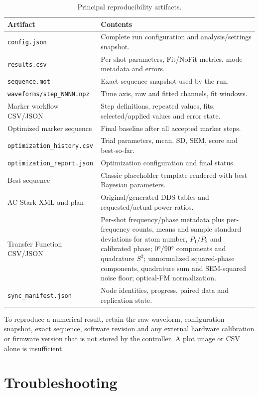 \documentclass[11pt,oneside,openany]{book}
\newcommand{\pathcode}[1]{\nolinkurl{#1}}
\begin{document}
\begin{table}[htbp]
\centering
\caption{Principal reproducibility artifacts.}
\begin{tabularx}{\textwidth}{l X}
\toprule
Artifact & Contents\\
\midrule
\pathcode{config.json} & Complete run configuration and analysis/settings snapshot.\\
\pathcode{results.csv} & Per-shot parameters, Fit/NoFit metrics, mode metadata and errors.\\
\pathcode{sequence.mot} & Exact sequence snapshot used by the run.\\
\pathcode{waveforms/step_NNNN.npz} & Time axis, raw and fitted channels, fit windows.\\
Marker workflow CSV/JSON & Step definitions, repeated values, fits, selected/applied values
and error state.\\
Optimized marker sequence & Final baseline after all accepted marker steps.\\
\pathcode{optimization_history.csv} & Trial parameters, mean, SD, SEM, score and best-so-far.\\
\pathcode{optimization_report.json} & Optimization configuration and final status.\\
Best sequence & Classic placeholder template rendered with best Bayesian parameters.\\
AC Stark XML and plan & Original/generated DDS tables and requested/actual power ratios.\\
Transfer Function CSV/JSON & Per-shot frequency/phase metadata plus per-frequency counts,
means and sample standard deviations for atom number, $P_1/P_2$ and calibrated phase;
\ang{0}/\ang{90} components and quadrature $S^2$; unnormalized squared-phase components,
quadrature sum and SEM-squared noise floor; optical-FM normalization.\\
\pathcode{sync_manifest.json} & Node identities, progress, paired data and replication state.\\
\bottomrule
\end{tabularx}
\end{table}

To reproduce a numerical result, retain the raw waveform, configuration snapshot, exact
sequence, software revision and any external hardware calibration or firmware version that
is not stored by the controller. A plot image or CSV alone is insufficient.

\chapter{Troubleshooting}\label{ch:trouble}
\end{document}
